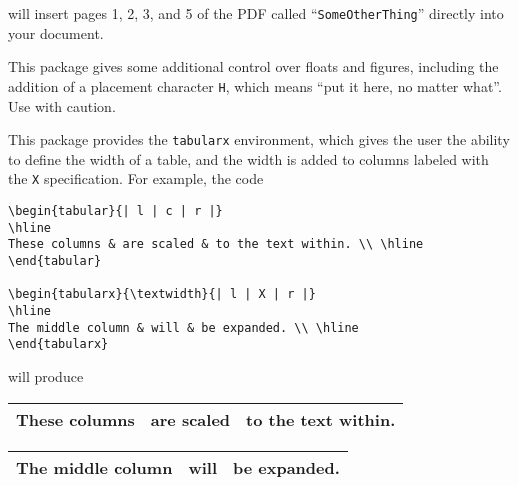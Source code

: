 \documentclass[letterpaper,12pt]{article}
\begin{document}
\begin{description}[align=margin,labelsep=0pt,leftmargin=0pt,style=multiline,labelwidth=63pt]
\begin{Verbatim}[frame=single,gobble=0,fontsize=\small]

\end{Verbatim}
will insert pages 1, 2, 3, and 5 of the PDF called ``\texttt{SomeOtherThing}'' directly into your document.


{}
\item[\href{http://ctan.mackichan.com/macros/latex/contrib/float/float.pdf}{\texttt{float}}] This package gives some additional control over floats and figures, including the addition of a placement character \texttt{H}, which means ``put it here, no matter what''. Use with caution.


{}
\item[\href{http://mirror.hmc.edu/ctan/macros/latex/required/tools/tabularx.pdf}{\texttt{tabularx}}] This package provides the \texttt{tabularx} environment, which gives the user the ability to define the width of a table, and the width is added to columns labeled with the \texttt{X} specification. For example, the code

\begin{Verbatim}[frame=single,gobble=0,fontsize=\small]
\begin{tabular}{| l | c | r |}
\hline
These columns & are scaled & to the text within. \\ \hline
\end{tabular}

\begin{tabularx}{\textwidth}{| l | X | r |}
\hline
The middle column & will & be expanded. \\ \hline
\end{tabularx}
\end{Verbatim}

will produce

\Needspace*{1in}
\begin{shaded*}
\begin{tabular}{| l | c | r |}
\hline
These columns & are scaled & to the text within. \\ \hline
\end{tabular}

\begin{tabularx}{\textwidth}{| l | X | r |}
\hline
The middle column & will & be expanded. \\ \hline
\end{tabularx}
\end{shaded*}



\end{description}
\end{document}
